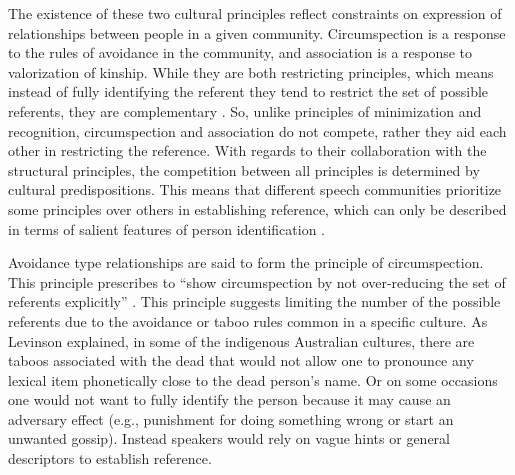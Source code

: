 \documentclass[12pt, draft]{article}
\begin{document}
The existence of these two cultural principles reflect constraints on expression of relationships between people in a given community. Circumspection is a response to the rules of avoidance in the community, and association is a response to valorization of kinship. While they are both restricting principles, which means instead of fully identifying the referent they tend to restrict the set of possible referents, they are complementary \parencite{blythe2009}. So, unlike principles of minimization and recognition, circumspection and association do not compete, rather they aid each other in restricting the reference. With regards to their collaboration with the structural principles, the competition between all principles is determined by cultural predispositions. This means that different speech communities prioritize some principles over others in establishing reference, which can only be described in terms of salient features of person identification \parencite{enfield2013a}. 

Avoidance type relationships are said to form the principle of circumspection. This principle prescribes to ``show circumspection by not over-reducing the set of referents explicitly'' \parencite[p. 31]{levinson2007}. This principle suggests limiting the number of the possible referents due to the avoidance or taboo rules common in a specific culture. As Levinson explained, in some of the indigenous Australian cultures, there are taboos associated with the dead that would not allow one to pronounce any lexical item phonetically close to the dead person's name. Or on some occasions one would not want to fully identify the person because it may cause an adversary effect (e.g., punishment for doing something wrong or start an unwanted gossip). Instead speakers would rely on vague hints or general descriptors to establish reference. 
\end{document}
